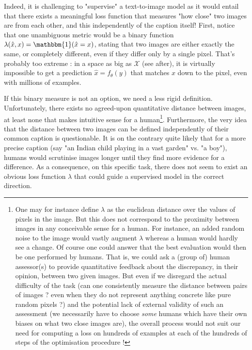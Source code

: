 \documentclass{article}
\begin{document}
\begin{multicols}{2}
Indeed, it is challenging to "supervise" a text-to-image model as it would entail that there exists a meaningful loss function that measures "how close" two images are from each other, and this independently of the caption itself!
First, notice that one unambiguous metric would be a binary function $\lambda(\hat x, x)=\mathbbm{1}(\hat x = x)$,
stating that two images are either exactly the same, or completely different, even if they differ only by a single pixel.
That's probably too extreme : in a space as big as $\mathcal{X}$ (see after), it is virtually impossible to get a prediction $\hat x=f_\theta(y)$ that matches $x$ down to the pixel, even with millions of examples.

If this binary measure is not an option, we need a less rigid definition.
Unfortunately, there exists no agreed-upon quantitative distance between images, at least none that makes intuitive sense for a human\footnote{One may for instance define $\lambda$ as the euclidean distance over the values of pixels in the image. But this does not correspond to the proximity between images in any conceivable sense for a human. For instance, an added random noise to the image would vastly augment $\lambda$ whereas a human would hardly see a change. Of course one could answer that the best evaluation would then be one performed by humans.
That is, we could ask a (group of) human assessor(s) to provide quantitative feedback about the discrepancy, in their opinion, between two given images.
But even if we disregard the actual difficulty of the task (can one consistently measure the distance between pairs of images ? even when they do not represent anything concrete like pure random pixels ?) and the potential lack of external validity of such an assessment (we necessarily have to choose \textit{some} humans which have their own biases on what two close images are), the overall process would not suit our need for computing a loss on hundreds of examples at each of the hundreds of steps of the optimisation procedure !}.
Furthermore, the very idea that the distance between two images can be defined independently of their common caption is questionable.
It is on the contrary quite likely that for a more precise caption (say "an Indian child playing in a vast garden" vs. "a boy"), humans would scrutinise images longer until they find more evidence for a difference.
As a consequence, on this specific task, there does not seem to exist an obvious loss function $\lambda$ that could guide a supervised model in the correct direction.


\end{multicols}
\end{document}
